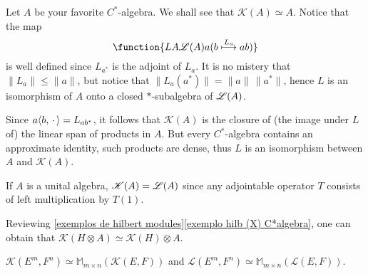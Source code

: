 \begin{exemplos}$\left.\right.$
    \label{exemplos: K( . )}
\begin{itroman}
    \item Let $A$ be your favorite $C^*$-algebra. We shall see that $\mathscr K(A) \simeq A$. Notice that the map 
    \begin{equation*}
        \function{{L}{A}{\adj(A)}{a}{
            (b \overset{L_a}\longmapsto ab)}}
    \end{equation*}
    is well defined since $L_{a^*}$ is the adjoint of $L_a$. It is no mistery that $\|L_a\| \leqslant \|a\|$, but notice that $\|L_a(a^*)\| = \|a\|\,\|a^*\|$, hence $L$ is an isomorphism of $A$ onto a closed $*$-subalgebra of $\mathscr L(A)$. \nocite{raeburn1998morita}
    
    Since $a\langle {b},{\operatorname{\,\cdot\,}}\rangle = L_{ab^*}$, it follows that $\mathscr K(A)$ is the closure of (the image under $L$ of) the linear span of products in $A$. But every $C^*$-algebra contains an approximate identity, such products are dense, thus $L$ is an isomorphism between $A$ and $\mathscr K(A)$.   

    \item \label{exemplo item: K(A)=L(A) pra A unital} If $A$ is a unital algebra, $\mathscr K(A) = \mathscr L(A)$ since any adjointable operator $T$ consists of left multiplication by $T(1)$.
    
    \item Reviewing \ref{exemplos de hilbert modules}\ref{exemplo hilb (X) C*algebra}, one can obtain that $\mathscr K(H\otimes A) \simeq \mathscr K(H) \otimes A$. 
    
    \item $\mathscr K(E^m, F^n) \simeq \mathbb M_{m\times n}(\mathscr K(E, F))$ and $\mathscr L(E^m, F^n) \simeq \mathbb M_{m\times n}(\mathscr L(E, F))$.
    
\end{itroman}
\end{exemplos}

